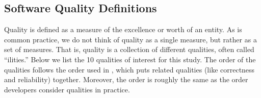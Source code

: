 \documentclass[final, 3p, times, authoryear]{elsarticle}
\begin{document}
\subsection{Software Quality Definitions} \label{sec_software_quality}

Quality is defined as a measure of the excellence or worth of an entity.  As is
common practice, we do not think of quality as a single measure, but rather as a
set of measures.  That is, quality is a collection of different qualities, often
called ``ilities.''  Below we list the 10 qualities of interest for this study.
The order of the qualities follows the order used in \citet{GhezziEtAl2003},
which puts related qualities (like correctness and reliability) together.
Moreover, the order is roughly the same as the order developers consider
qualities in practice.
\end{document}

